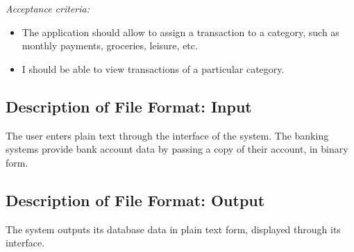 \documentclass[11pt]{article}
\newcounter{use case ID}
\begin{document}
\textit{Acceptance criteria:}
\begin{itemize}
    \item The application should allow to assign a transaction to a category, such as monthly payments, groceries, leisure, etc.
    \item I should be able to view transactions of a particular category.
\end{itemize}

\subsection{Description of File Format: Input}

The user enters plain text through the interface of the system. The banking systems provide bank account data by passing a copy of their account, in binary form.

\subsection{Description of File Format: Output}

The system outputs its database data in plain text form, displayed through its interface.
\end{document}
